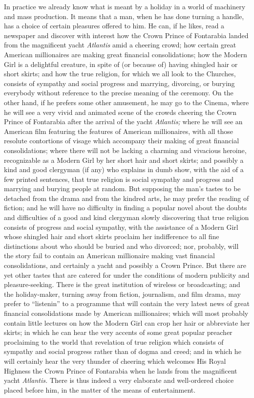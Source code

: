 \documentclass{book}
\begin{document}
In practice we already know what is meant by a holiday in a world of machinery and mass production. It means that a man, when he has done turning a handle, has a choice of certain pleasures offered to him. He can, if he likes, read a newspaper and discover with interest how the Crown Prince of Fontarabia landed from the magnificent yacht \emph{Atlantis} amid a cheering crowd; how certain great American millionaires are making great financial consolidations; how the Modern Girl is a delightful creature, in spite of (or because of) having shingled hair or short skirts; and how the true religion, for which we all look to the Churches, consists of sympathy and social progress and marrying, divorcing, or burying everybody without reference to the precise meaning of the ceremony. On the other hand, if he prefers some other amusement, he may go to the Cinema, where he will see a very vivid and animated scene of the crowds cheering the Crown Prince of Fontarabia after the arrival of the yacht \emph{Atlantis;} where he will see an American film featuring the features of American millionaires, with all those resolute contortions of visage which accompany their making of great financial consolidations; where there will not be lacking a charming and vivacious heroine, recognizable as a Modern Girl by her short hair and short skirts; and possibly a kind and good clergyman (if any) who explains in dumb show, with the aid of a few printed sentences, that true religion is social sympathy and progress and marrying and burying people at random. But supposing the man’s tastes to be detached from the drama and from the kindred arts, he may prefer the reading of fiction; and he will have no difficulty in finding a popular novel about the doubts and difficulties of a good and kind clergyman slowly discovering that true religion consists of progress and social sympathy, with the assistance of a Modern Girl whose shingled hair and short skirts proclaim her indifference to all fine distinctions about who should be buried and who divorced; nor, probably, will the story fail to contain an American millionaire making vast financial consolidations, and certainly a yacht and possibly a Crown Prince. But there are yet other tastes that are catered for under the conditions of modern publicity and pleasure-seeking. There is the great institution of wireless or broadcasting; and the holiday-maker, turning away from fiction, journalism, and film drama, may prefer to “listenin” to a programme that will contain the very latest news of great financial consolidations made by American millionaires; which will most probably contain little lectures on how the Modern Girl can crop her hair or abbreviate her skirts; in which he can hear the very accents of some great popular preacher proclaiming to the world that revelation of true religion which consists of sympathy and social progress rather than of dogma and creed; and in which he will certainly hear the very thunder of cheering which welcomes His Royal Highness the Crown Prince of Fontarabia when he lands from the magnificent yacht \emph{Atlantis.} There is thus indeed a very elaborate and well-ordered choice placed before him, in the matter of the means of entertainment.
\end{document}
